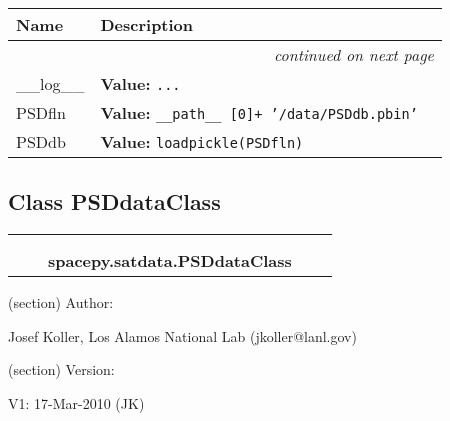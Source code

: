     \vspace{-1cm}
\hspace{\varindent}\begin{longtable}{|p{\varnamewidth}|p{\vardescrwidth}|l}
\cline{1-2}
\cline{1-2} \centering \textbf{Name} & \centering \textbf{Description}& \\
\cline{1-2}
\endhead\cline{1-2}\multicolumn{3}{r}{\small\textit{continued on next page}}\\\endfoot\cline{1-2}
\endlastfoot\raggedright \_\-\_\-l\-o\-g\-\_\-\_\- & \raggedright \textbf{Value:} 
{\tt \texttt{...}}&\\
\cline{1-2}
\raggedright P\-S\-D\-f\-l\-n\- & \raggedright \textbf{Value:} 
{\tt \_\_path\_\_ [0]+ '/data/PSDdb.pbin'}&\\
\cline{1-2}
\raggedright P\-S\-D\-d\-b\- & \raggedright \textbf{Value:} 
{\tt loadpickle(PSDfln)}&\\
\cline{1-2}
\end{longtable}



\subsection{Class PSDdataClass}

    \label{spacepy:satdata:PSDdataClass}
\begin{tabular}{cccccc}
\multicolumn{2}{r}{\settowidth{\BCL}{object}\multirow{2}{\BCL}{object}}
&&
  \\\cline{3-3}
  &&\multicolumn{1}{c|}{}
&&
  \\
&&\multicolumn{2}{l}{\textbf{spacepy.satdata.PSDdataClass}}
\end{tabular}

(section) Author:

  Josef Koller, Los Alamos National Lab (jkoller@lanl.gov)

(section) Version:

  V1: 17-Mar-2010 (JK)




